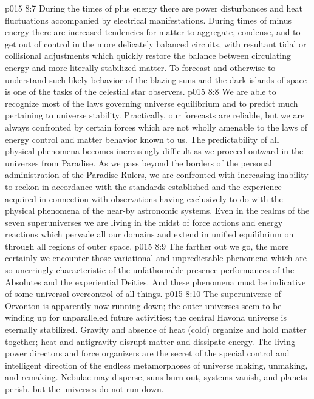 \vs p015 8:7 During the times of plus energy there are power disturbances and heat fluctuations accompanied by electrical manifestations. During times of minus energy there are increased tendencies for matter to aggregate, condense, and to get out of control in the more delicately balanced circuits, with resultant tidal or collisional adjustments which quickly restore the balance between circulating energy and more literally stabilized matter. To forecast and otherwise to understand such likely behavior of the blazing suns and the dark islands of space is one of the tasks of the celestial star observers.
\vs p015 8:8 We are able to recognize most of the laws governing universe equilibrium and to predict much pertaining to universe stability. Practically, our forecasts are reliable, but we are always confronted by certain forces which are not wholly amenable to the laws of energy control and matter behavior known to us. The predictability of all physical phenomena becomes increasingly difficult as we proceed outward in the universes from Paradise. As we pass beyond the borders of the personal administration of the Paradise Rulers, we are confronted with increasing inability to reckon in accordance with the standards established and the experience acquired in connection with observations having exclusively to do with the physical phenomena of the near\hyp{}by astronomic systems. Even in the realms of the seven superuniverses we are living in the midst of force actions and energy reactions which pervade all our domains and extend in unified equilibrium on through all regions of outer space.
\vs p015 8:9 The farther out we go, the more certainly we encounter those variational and unpredictable phenomena which are so unerringly characteristic of the unfathomable presence\hyp{}performances of the Absolutes and the experiential Deities. And these phenomena must be indicative of some universal overcontrol of all things.
\vs p015 8:10 The superuniverse of Orvonton is apparently now running down; the outer universes seem to be winding up for unparalleled future activities; the central Havona universe is eternally stabilized. Gravity and absence of heat (cold) organize and hold matter together; heat and antigravity disrupt matter and dissipate energy. The living power directors and force organizers are the secret of the special control and intelligent direction of the endless metamorphoses of universe making, unmaking, and remaking. Nebulae may disperse, suns burn out, systems vanish, and planets perish, but the universes do not run down.
